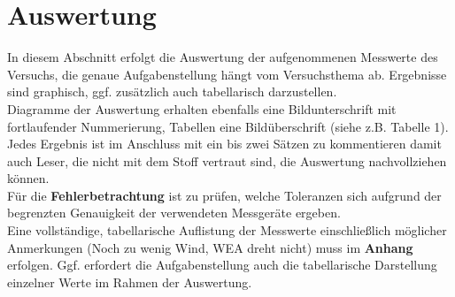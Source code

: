 \section{Auswertung}
In diesem Abschnitt erfolgt die Auswertung der aufgenommenen Messwerte des
 Versuchs, die genaue Aufgabenstellung hängt vom Versuchsthema ab. Ergebnisse
  sind graphisch, ggf. zusätzlich auch tabellarisch darzustellen.\\

Diagramme der Auswertung erhalten ebenfalls eine Bildunterschrift mit
fortlaufender Nummerierung, Tabellen eine Bildüberschrift (siehe z.B. Tabelle 1).
Jedes Ergebnis ist im Anschluss mit ein bis zwei Sätzen zu kommentieren damit auch
Leser, die nicht mit dem Stoff vertraut sind,
die Auswertung nachvollziehen können.\\

Für die \textbf{Fehlerbetrachtung} ist zu prüfen, welche Toleranzen sich aufgrund
 der begrenzten Genauigkeit der verwendeten Messgeräte ergeben.\\

Eine vollständige, tabellarische Auflistung der Messwerte einschließlich
 möglicher Anmerkungen (\glqq Noch zu wenig Wind, WEA dreht nicht\grqq{}) muss
  im \textbf{Anhang} erfolgen. Ggf. erfordert die Aufgabenstellung auch
   die tabellarische Darstellung einzelner Werte im Rahmen der Auswertung.\\

